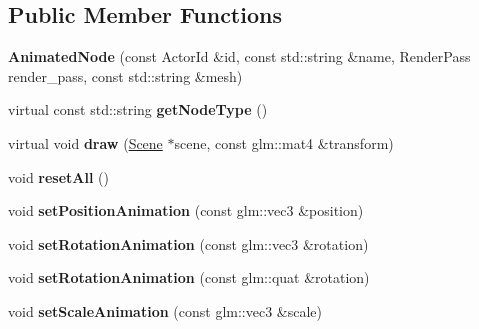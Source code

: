 \subsection*{Public Member Functions}
\begin{DoxyCompactItemize}
\item 
\mbox{\label{classTarbora_1_1AnimatedNode_a9a53e7180e339f37d11c2a565efa36f1}} 
{\bfseries Animated\+Node} (const Actor\+Id \&id, const std\+::string \&name, Render\+Pass render\+\_\+pass, const std\+::string \&mesh)
\item 
\mbox{\label{classTarbora_1_1AnimatedNode_af6e8caa16b073c2c4e9a74ba9c4385d5}} 
virtual const std\+::string {\bfseries get\+Node\+Type} ()
\item 
\mbox{\label{classTarbora_1_1AnimatedNode_ab2ca2c3bc1ef81c51cc6060f5495ba2a}} 
virtual void {\bfseries draw} (\hyperlink{classTarbora_1_1Scene}{Scene} $\ast$scene, const glm\+::mat4 \&transform)
\item 
\mbox{\label{classTarbora_1_1AnimatedNode_a6da3fadd5907f3970b6257ace4755bd4}} 
void {\bfseries reset\+All} ()
\item 
\mbox{\label{classTarbora_1_1AnimatedNode_af273bb9d74d9e41e2d602cd954e36562}} 
void {\bfseries set\+Position\+Animation} (const glm\+::vec3 \&position)
\item 
\mbox{\label{classTarbora_1_1AnimatedNode_a6f1e6162f6a50ce39ce65b08cbc8a159}} 
void {\bfseries set\+Rotation\+Animation} (const glm\+::vec3 \&rotation)
\item 
\mbox{\label{classTarbora_1_1AnimatedNode_a09bccc0e9e1e2450eeca7acbb58cc6ad}} 
void {\bfseries set\+Rotation\+Animation} (const glm\+::quat \&rotation)
\item 
\mbox{\label{classTarbora_1_1AnimatedNode_a2e5a5186a22248d950223b7224b6167c}} 
void {\bfseries set\+Scale\+Animation} (const glm\+::vec3 \&scale)
\item 
\mbox{\label{classTarbora_1_1AnimatedNode_ab2bc2200bbdacc8bb27573b8da0cdd00}} 

\end{DoxyCompactItemize}
